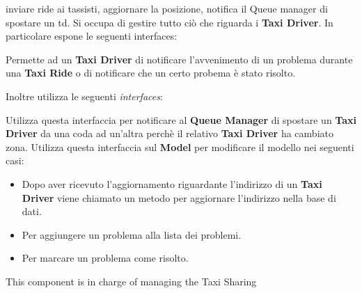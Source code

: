 \begin{itemize}
\begin{itemize}
		 inviare ride ai tassisti, aggiornare la posizione, notifica il Queue manager di spostare un td.
		 Si occupa di gestire tutto ciò che riguarda i \textbf{Taxi Driver}. In particolare espone le seguenti interfaces:
		\begin{itemize}
			 Permette ad un \textbf{Taxi Driver} di notificare l'avvenimento di un problema durante una \textbf{Taxi Ride} o di notificare che un certo probema è stato risolto.
		\end{itemize}
		Inoltre utilizza le seguenti \textit{interfaces}:
		\begin{itemize}
			 Utilizza questa interfaccia per notificare al \textbf{Queue Manager} di spostare un \textbf{Taxi Driver} da una coda ad un'altra perchè il relativo \textbf{Taxi Driver} ha cambiato zona.
			 Utilizza questa interfaccia sul \textbf{Model} per modificare il modello nei seguenti casi: 
			\begin{itemize}
				\item Dopo aver ricevuto l'aggiornamento riguardante l'indirizzo di un \textbf{Taxi Driver} viene chiamato un metodo per aggiornare l'indirizzo nella base di dati.
				\item Per aggiungere un problema alla lista dei problemi.
				\item Per marcare un problema come risolto.
			\end{itemize}
		\end{itemize}
		
		This component is in charge of managing the Taxi Sharing
	\end{itemize}
	

\end{itemize}
